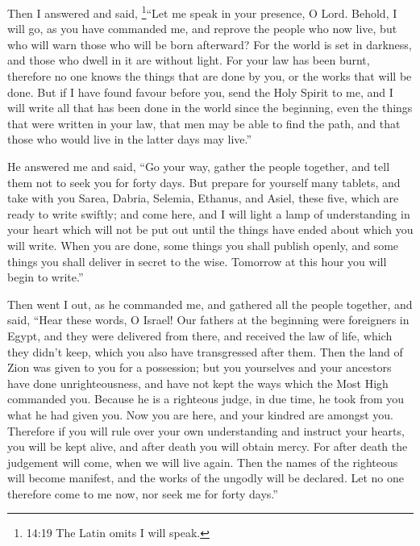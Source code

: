  Then I answered and said, \footnote{14:19 The Latin omits
  I will speak.}``Let me speak in your presence, O Lord. 
Behold, I will go, as you have commanded me, and reprove the people who
now live, but who will warn those who will be born afterward? For the
world is set in darkness, and those who dwell in it are without light.
 For your law has been burnt, therefore no one knows the
things that are done by you, or the works that will be done.
 But if I have found favour before you, send the Holy
Spirit to me, and I will write all that has been done in the world since
the beginning, even the things that were written in your law, that men
may be able to find the path, and that those who would live in the
latter days may live.''

 He answered me and said, ``Go your way, gather the people
together, and tell them not to seek you for forty days. 
But prepare for yourself many tablets, and take with you Sarea, Dabria,
Selemia, Ethanus, and Asiel, these five, which are ready to write
swiftly;  and come here, and I will light a lamp of
understanding in your heart which will not be put out until the things
have ended about which you will write.  When you are done,
some things you shall publish openly, and some things you shall deliver
in secret to the wise. Tomorrow at this hour you will begin to write.''

 Then went I out, as he commanded me, and gathered all the
people together, and said,  ``Hear these words, O Israel!
 Our fathers at the beginning were foreigners in Egypt, and
they were delivered from there,  and received the law of
life, which they didn't keep, which you also have transgressed after
them.  Then the land of Zion was given to you for a
possession; but you yourselves and your ancestors have done
unrighteousness, and have not kept the ways which the Most High
commanded you.  Because he is a righteous judge, in due
time, he took from you what he had given you.  Now you are
here, and your kindred are amongst you.  Therefore if you
will rule over your own understanding and instruct your hearts, you will
be kept alive, and after death you will obtain mercy.  For
after death the judgement will come, when we will live again. Then the
names of the righteous will become manifest, and the works of the
ungodly will be declared.  Let no one therefore come to me
now, nor seek me for forty days.''

